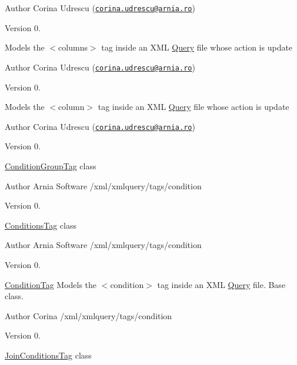 \begin{DoxyAuthor}{Author}
Corina Udrescu (\href{mailto:corina.udrescu@arnia.ro}{\tt corina.\+udrescu@arnia.\+ro})  
\end{DoxyAuthor}
\begin{DoxyVersion}{Version}
0.
\end{DoxyVersion}
Models the $<$columns$>$ tag inside an X\+M\+L \hyperlink{classQuery}{Query} file whose action is \textquotesingle{}update\textquotesingle{}

\begin{DoxyAuthor}{Author}
Corina Udrescu (\href{mailto:corina.udrescu@arnia.ro}{\tt corina.\+udrescu@arnia.\+ro})  
\end{DoxyAuthor}
\begin{DoxyVersion}{Version}
0.
\end{DoxyVersion}
Models the $<$column$>$ tag inside an X\+M\+L \hyperlink{classQuery}{Query} file whose action is \textquotesingle{}update\textquotesingle{}

\begin{DoxyAuthor}{Author}
Corina Udrescu (\href{mailto:corina.udrescu@arnia.ro}{\tt corina.\+udrescu@arnia.\+ro})  
\end{DoxyAuthor}
\begin{DoxyVersion}{Version}
0.
\end{DoxyVersion}
\hyperlink{classConditionGroupTag}{Condition\+Group\+Tag} class

\begin{DoxyAuthor}{Author}
Arnia Software /xml/xmlquery/tags/condition 
\end{DoxyAuthor}
\begin{DoxyVersion}{Version}
0.
\end{DoxyVersion}
\hyperlink{classConditionsTag}{Conditions\+Tag} class

\begin{DoxyAuthor}{Author}
Arnia Software /xml/xmlquery/tags/condition 
\end{DoxyAuthor}
\begin{DoxyVersion}{Version}
0.
\end{DoxyVersion}
\hyperlink{classConditionTag}{Condition\+Tag} Models the $<$condition$>$ tag inside an X\+M\+L \hyperlink{classQuery}{Query} file. Base class.

\begin{DoxyAuthor}{Author}
Corina /xml/xmlquery/tags/condition 
\end{DoxyAuthor}
\begin{DoxyVersion}{Version}
0.
\end{DoxyVersion}
\hyperlink{classJoinConditionsTag}{Join\+Conditions\+Tag} class

